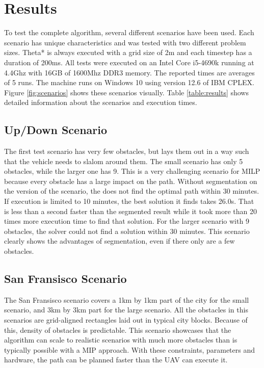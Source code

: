 \section{Results}
To test the complete algorithm, several different scenarios have been used. Each scenario has unique characteristics and was tested with two different problem sizes. Theta* is always executed with a grid size of 2m and each timestep has a duration of 200ms. All tests were executed on an Intel Core i5-4690k running at 4.4Ghz with 16GB of 1600Mhz DDR3 memory. The reported times are averages of 5 runs. The machine runs on Windows 10 using version 12.6 of IBM CPLEX. Figure \ref{fig:scenarios} shows these scenarios visually. Table \ref{table:results} shows detailed information about the scenarios and execution times.

\subsection{Up/Down Scenario}
The first test scenario has very few obstacles, but lays them out in a way such that the vehicle needs to slalom around them. The small scenario has only 5 obstacles, while the larger one has 9. This is a very challenging scenario for MILP because every obstacle has a large impact on the path. Without segmentation on the version of the scenario, the does not find the optimal path within 30 minutes. If execution is limited to 10 minutes, the best solution it finds takes 26.0s. That is less than a second faster than the segmented result while it took more than 20 times more execution time to find that solution. For the larger scenario with 9 obstacles, the solver could not find a solution within 30 minutes. This scenario clearly shows the advantages of segmentation, even if there only are a few obstacles.

\subsection{San Fransisco Scenario}
The San Fransisco scenario covers a 1km by 1km part of the city for the small scenario, and 3km by 3km part for the large scenario. All the obstacles in this scenarios are grid-aligned rectangles laid out in typical city blocks. Because of this, density of obstacles is predictable. This scenario showcases that the algorithm can scale to realistic scenarios with much more obstacles than is typically possible with a MIP approach. With these constraints, parameters and hardware, the path can be planned faster than the UAV can execute it.

